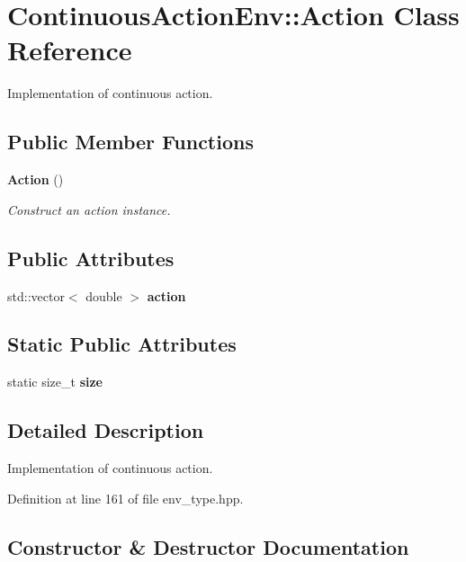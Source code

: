 \section{Continuous\+Action\+Env\+:\+:Action Class Reference}
\label{classmlpack_1_1rl_1_1ContinuousActionEnv_1_1Action}


Implementation of continuous action.  


\subsection*{Public Member Functions}
\begin{DoxyCompactItemize}
\item 
\textbf{ Action} ()
\begin{DoxyCompactList}\small\item\em Construct an action instance. \end{DoxyCompactList}\end{DoxyCompactItemize}
\subsection*{Public Attributes}
\begin{DoxyCompactItemize}
\item 
std\+::vector$<$ double $>$ \textbf{ action}
\end{DoxyCompactItemize}
\subsection*{Static Public Attributes}
\begin{DoxyCompactItemize}
\item 
static size\+\_\+t \textbf{ size}
\end{DoxyCompactItemize}


\subsection{Detailed Description}
Implementation of continuous action. 

Definition at line 161 of file env\+\_\+type.\+hpp.



\subsection{Constructor \& Destructor Documentation}
\mbox{\label{classmlpack_1_1rl_1_1ContinuousActionEnv_1_1Action_a9e72d404d52a0c6d6edefac30f76e02d}} 
